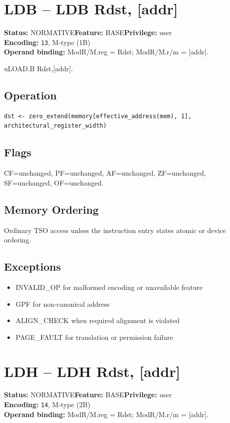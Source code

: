 \documentclass[10pt]{article}
\begin{document}
\section{LDB -- LDB Rdst, [addr]}
\textbf{Status:} NORMATIVE\quad \textbf{Feature:} BASE\quad \textbf{Privilege:} user\\
\textbf{Encoding:} \texttt{13}, M-type (1B)\\
\textbf{Operand binding:} ModR/M.reg = Rdst; ModR/M.r/m = [addr].

uLOAD.B Rdst,[addr].

\subsection*{Operation}
\begin{lstlisting}
dst <- zero_extend(memory[effective_address(mem), 1], architectural_register_width)
\end{lstlisting}
\subsection*{Flags}
CF=unchanged, PF=unchanged, AF=unchanged, ZF=unchanged, SF=unchanged, OF=unchanged.
\subsection*{Memory Ordering}
Ordinary TSO access unless the instruction entry states atomic or device ordering.
\subsection*{Exceptions}
\begin{itemize}
\item INVALID\_OP for malformed encoding or unavailable feature
\item GPF for non-canonical address
\item ALIGN\_CHECK when required alignment is violated
\item PAGE\_FAULT for translation or permission failure
\end{itemize}
\clearpage

\section{LDH -- LDH Rdst, [addr]}
\textbf{Status:} NORMATIVE\quad \textbf{Feature:} BASE\quad \textbf{Privilege:} user\\
\textbf{Encoding:} \texttt{14}, M-type (2B)\\
\textbf{Operand binding:} ModR/M.reg = Rdst; ModR/M.r/m = [addr].
\end{document}
